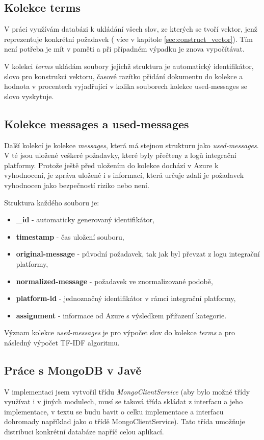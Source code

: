 \documentclass[thesis=M,czech]{FITthesis}[2012/10/20]
\begin{document}
	
	\subsection{Kolekce terms}
		V práci využívám databázi k ukládání všech slov, ze kterých se tvoří vektor, jenž reprezentuje konkrétní požadavek ( více v kapitole \ref{sec:construct_vector}). Tím není potřeba je mít v paměti a při případném výpadku je znova vypočítávat.
	
		V kolekci \textit{terms} ukládám soubory jejichž struktura je automatický identifikátor, slovo pro konstrukci vektoru, časové razítko přidání dokumentu do kolekce a hodnota v procentech vyjadřující v kolika souborech kolekce used-messages se slovo vyskytuje.
	
	\subsection{Kolekce messages a used-messages}
		Další kolekcí je kolekce \textit{messages}, která má stejnou strukturu jako \textit{used-messages}. V té jsou uložené veškeré požadavky, které byly přečteny z logů integrační platformy. Protože ještě před uložením do kolekce dochází v Azure k vyhodnocení, je zpráva uložené i s informací, která určuje zdali je požadavek vyhodnocen jako bezpečností riziko nebo není. 
	
		Struktura každého souboru je: 
	
		\begin{itemize} 
			\item \textbf{\_id} - automaticky generovaný identifikátor,
			\item \textbf{timestamp} - čas uložení souboru,
			\item \textbf{original-message} - původní požadavek, tak jak byl převzat z logu integrační platformy,
			\item \textbf{normalized-message} - požadavek ve znormalizované podobě,
			\item \textbf{platform-id} - jednoznačný identifikátor v rámci integrační platformy,
			\item \textbf{assignment} - informace od Azure s výsledkem přiřazení kategorie. 	
		\end{itemize}
	
		Význam kolekce \textit{used-messages} je pro výpočet slov do kolekce \textit{terms} a pro následný výpočet TF-IDF algoritmu.

	\subsection{Práce s MongoDB v Javě}
		V implementaci jsem vytvořil třídu \textit{MongoClientService} (aby bylo možné třídy využívat i v jiných modulech, musí se taková třída skládat z interfacu a jeho implementace, v textu se budu bavit o celku implementace a interfacu dohromady například jako o třídě MongoClientService). Tato třída umožňuje distribuci konkrétní databáze napříč celou aplikací. 
	
\end{document}

